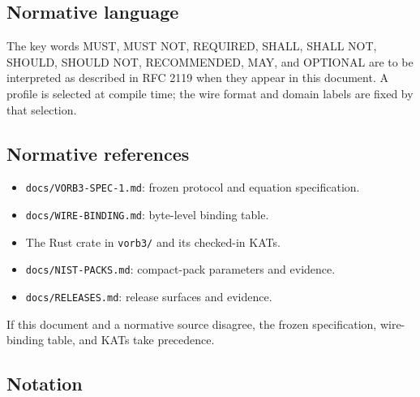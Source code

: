 \documentclass[11pt,a4paper]{article}
\begin{document}
\subsection{Normative language}

The key words MUST, MUST NOT, REQUIRED, SHALL, SHALL NOT, SHOULD, SHOULD NOT,
RECOMMENDED, MAY, and OPTIONAL are to be interpreted as described in RFC 2119
when they appear in this document. A profile is selected at compile time; the
wire format and domain labels are fixed by that selection.

\subsection{Normative references}

\begin{itemize}
  \item \texttt{docs/VORB3-SPEC-1.md}: frozen protocol and equation
        specification.
  \item \texttt{docs/WIRE-BINDING.md}: byte-level binding table.
  \item The Rust crate in \texttt{vorb3/} and its checked-in KATs.
  \item \texttt{docs/NIST-PACKS.md}: compact-pack parameters and evidence.
  \item \texttt{docs/RELEASES.md}: release surfaces and evidence.
\end{itemize}
If this document and a normative source disagree, the frozen specification,
wire-binding table, and KATs take precedence.

\subsection{Notation}
\end{document}
